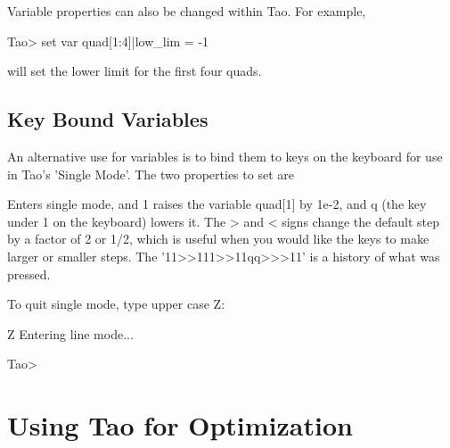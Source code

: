 \documentclass{hitec}
\newcommand{\Section}[1]{\section{#1}\vspace*{-1ex}}
\begin{document}
Variable properties can also be changed within Tao. For example, 
\begin{code}
Tao> set var quad[1:4]|low_lim = -1
\end{code}
will set the lower limit for the first four quads.


\subsection{Key Bound Variables}


An alternative use for variables is to bind them to keys on the keyboard for use in Tao's 'Single Mode'. The two properties to set are %

Enters single mode, and 1 raises the variable quad[1] by 1e-2, and q (the key under 1 on the keyboard) lowers it. The > and < signs change the default step by a factor of 2 or 1/2, which is useful when you would like the keys to make larger or smaller steps. The '11>>111>>11qq>>>11' is a history of what was pressed. 

To quit single mode, type upper case Z:
\begin{code}
Z
Entering line mode...
    
Tao> 
\end{code}


\Section{Using Tao for Optimization}
\end{document}
